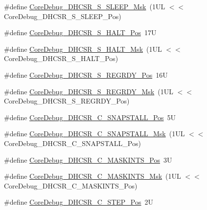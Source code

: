 \begin{DoxyCompactItemize}
\#define \hyperlink{group___c_m_s_i_s___core_debug_ga98d51538e645c2c1a422279cd85a0a25}{Core\+Debug\+\_\+\+D\+H\+C\+S\+R\+\_\+\+S\+\_\+\+S\+L\+E\+E\+P\+\_\+\+Msk}~(1\+U\+L $<$$<$ Core\+Debug\+\_\+\+D\+H\+C\+S\+R\+\_\+\+S\+\_\+\+S\+L\+E\+E\+P\+\_\+\+Pos)
\item 
\#define \hyperlink{group___c_m_s_i_s___core_debug_ga760a9a0d7f39951dc3f07d01f1f64772}{Core\+Debug\+\_\+\+D\+H\+C\+S\+R\+\_\+\+S\+\_\+\+H\+A\+L\+T\+\_\+\+Pos}~17U
\item 
\#define \hyperlink{group___c_m_s_i_s___core_debug_ga9f881ade3151a73bc5b02b73fe6473ca}{Core\+Debug\+\_\+\+D\+H\+C\+S\+R\+\_\+\+S\+\_\+\+H\+A\+L\+T\+\_\+\+Msk}~(1\+U\+L $<$$<$ Core\+Debug\+\_\+\+D\+H\+C\+S\+R\+\_\+\+S\+\_\+\+H\+A\+L\+T\+\_\+\+Pos)
\item 
\#define \hyperlink{group___c_m_s_i_s___core_debug_ga20a71871ca8768019c51168c70c3f41d}{Core\+Debug\+\_\+\+D\+H\+C\+S\+R\+\_\+\+S\+\_\+\+R\+E\+G\+R\+D\+Y\+\_\+\+Pos}~16U
\item 
\#define \hyperlink{group___c_m_s_i_s___core_debug_gac4cd6f3178de48f473d8903e8c847c07}{Core\+Debug\+\_\+\+D\+H\+C\+S\+R\+\_\+\+S\+\_\+\+R\+E\+G\+R\+D\+Y\+\_\+\+Msk}~(1\+U\+L $<$$<$ Core\+Debug\+\_\+\+D\+H\+C\+S\+R\+\_\+\+S\+\_\+\+R\+E\+G\+R\+D\+Y\+\_\+\+Pos)
\item 
\#define \hyperlink{group___c_m_s_i_s___core_debug_ga85747214e2656df6b05ec72e4d22bd6d}{Core\+Debug\+\_\+\+D\+H\+C\+S\+R\+\_\+\+C\+\_\+\+S\+N\+A\+P\+S\+T\+A\+L\+L\+\_\+\+Pos}~5U
\item 
\#define \hyperlink{group___c_m_s_i_s___core_debug_ga53aa99b2e39a67622f3b9973e079c2b4}{Core\+Debug\+\_\+\+D\+H\+C\+S\+R\+\_\+\+C\+\_\+\+S\+N\+A\+P\+S\+T\+A\+L\+L\+\_\+\+Msk}~(1\+U\+L $<$$<$ Core\+Debug\+\_\+\+D\+H\+C\+S\+R\+\_\+\+C\+\_\+\+S\+N\+A\+P\+S\+T\+A\+L\+L\+\_\+\+Pos)
\item 
\#define \hyperlink{group___c_m_s_i_s___core_debug_ga0d2907400eb948a4ea3886ca083ec8e3}{Core\+Debug\+\_\+\+D\+H\+C\+S\+R\+\_\+\+C\+\_\+\+M\+A\+S\+K\+I\+N\+T\+S\+\_\+\+Pos}~3U
\item 
\#define \hyperlink{group___c_m_s_i_s___core_debug_ga77fe1ef3c4a729c1c82fb62a94a51c31}{Core\+Debug\+\_\+\+D\+H\+C\+S\+R\+\_\+\+C\+\_\+\+M\+A\+S\+K\+I\+N\+T\+S\+\_\+\+Msk}~(1\+U\+L $<$$<$ Core\+Debug\+\_\+\+D\+H\+C\+S\+R\+\_\+\+C\+\_\+\+M\+A\+S\+K\+I\+N\+T\+S\+\_\+\+Pos)
\item 
\#define \hyperlink{group___c_m_s_i_s___core_debug_gae1fc39e80de54c0339cbb1b298a9f0f9}{Core\+Debug\+\_\+\+D\+H\+C\+S\+R\+\_\+\+C\+\_\+\+S\+T\+E\+P\+\_\+\+Pos}~2U
\item 
$$
\end{DoxyCompactItemize}
